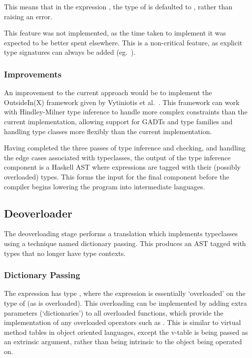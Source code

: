 \documentclass[dissertation.tex]{subfiles}
\begin{document}
{{{            This means that in the expression , the type of  is defaulted to , rather than raising an error.

            This feature was not implemented, as the time taken to implement it was expected to be better spent elsewhere. This is a non-critical feature, as explicit type signatures can always be added (eg.\ ).
        }
        \subsubsection{Improvements}
        {
            An improvement to the current approach would be to implement the OutsideIn(X) framework given by Vytiniotis et al.\ \cite{OutsideIn}. This framework can work with Hindley-Milner type inference to handle more complex constraints than the current implementation, allowing support for GADTs and type families and handling type classes more flexibly than the current implementation.
        }

        \vspace{0.5cm}
        Having completed the three passes of type inference and checking, and handling the edge cases associated with typeclasses, the output of the type inference component is a Haskell AST where expressions are tagged with their (possibly overloaded) types. This forms the input for the final component before the compiler begins lowering the program into intermediate languages. 
    }
    \subsection{Deoverloader}\label{sec:deoverloading}
    {
        The deoverloading stage performs a translation which implements typeclasses using a technique named dictionary passing. This produces an AST tagged with types that no longer have type contexts.

        \subsubsection{Dictionary Passing}
        {
            The expression  has type , where the expression is essentially `overloaded' on the type of  (as \haskell{(+)} is overloaded). This overloading can be implemented by adding extra parameters (`dictionaries') to all overloaded functions, which provide the implementation of any overloaded operators such as \haskell{(+)}. This is similar to virtual method tables in object oriented languages, except the v-table is being passed as an extrinsic argument, rather than being intrinsic to the object being operated on.

}}}
\end{document}
